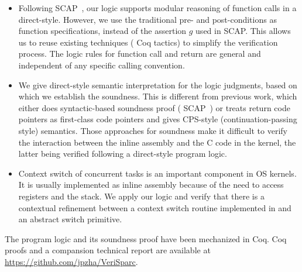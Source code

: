 \begin{itemize}
	
	\item
    Following SCAP~\cite{Feng06pldi}, our logic supports
    modular reasoning of function calls in a direct-style.
    However,
    we use the traditional pre- and post-conditions as function
    specifications, instead of the assertion $g$ used
    in SCAP. This allows us to reuse existing techniques
    (\eg{} Coq tactics) to simplify the %
    verification process.
    The logic rules for function call and return are general
    and independent of any specific calling convention.

    \item
    We give direct-style semantic interpretation for
    the logic judgments, based on which we establish the
    soundness. This is different from previous
    work, which either does syntactic-based soundness proof
    (\eg{} SCAP~\cite{Feng06pldi}) or treats return code pointers
    as first-class code pointers and gives CPS-style
    (continuation-passing style) semantics.
    Those approaches for soundness make it difficult to verify
    the interaction between the inline assembly and the C
    code in the kernel, the latter being verified following
    a direct-style program logic.

    \item
	Context switch of concurrent tasks is an important
    component in OS kernels. It is usually implemented
    as inline assembly because of the need to access
    registers and the stack. We apply our logic and
    verify that there is a contextual refinement
    between a context switch routine implemented
    in \sparc{} and an abstract switch primitive.


\end{itemize}
The program logic and its soundness proof
have been mechanized in Coq. Coq proofs and a compansion 
technical report are available at 
\url{https://github.com/jpzha/VeriSparc}.

